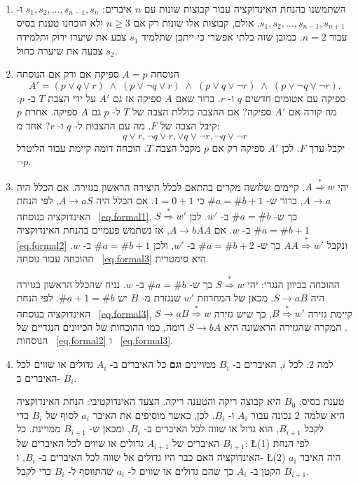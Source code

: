\begin{enumerate}
\item
השתמשנו בהנחת האינדוקציה עבור קבוצות שונות עם
$n$
איברים:
$s_1,s_2,\ldots,s_{n-1},s_n$
ו-%
$s_1,s_2,\ldots,s_{n-1},s_{n+1}$.
אולם, קבוצות אלו שונות רק אם
$n\geq 3$
ולא הוכחנו טענת בסיס עבור 
$n=2$.
כמובן שזה בלתי אפשרי כי ייתכן שתלמיד
$s_1$
צבע את שיערו ירוק ותלמידה
$s_2$
צבעה את שיערה כחול.


\item
הנוסחה
$A=p$
ספיקה אם ורק אם הנוסחה
\[
A'= (p \vee q \vee r) \;\wedge\; (p \vee \neg q \vee r) \;\wedge\; (p \vee q \vee \neg r) \;\wedge\; (p \vee \neg q \vee \neg r).
\]
ספיקה עם אטומים חדשים 
$q$
ו-%
$r$.
ברור שאם
$A$
ספיקה אז גם 
$A'$
על ידי הצבת
$T$
ב-%
$p$.
מה קורה אם 
$A'$
ספיקה? אם ההצבה כוללת הצבה של 
$T$
ל-%
$p$
גם
$A$
ספיקה. אחרת
$p$
קיבל הצבה של
$F$.
מה עם ההצבות ל-%
$q$
ו-%
$r$?
אחד מ:
\[
q \vee r, \neg q \vee r,\vee q \vee \neg r, \neg q \vee \neg r
\]
יקבל ערך
$F$.
לכן
$A'$
ספיקה רק אם 
$p$
מקבל הצבה
$T$.
הוכחה דומה קיימת עבור הליטרל
$\neg p$.

\item
יהי
$A\stackrel{*}{\Rightarrow} w$.
קיימים שלושה מקרים בהתאם לכלל היצירה הראשון בגזירה. אם הכלל היה
$A \rightarrow a$,
ברור ש-%
$\#a=\#b+1$
כי
$1=0+1$.
אם הכלל היה
$A\rightarrow aS$,
לפי הנחת האינדוקציה בנוסחה~%
\ref{eq.formal1}, $S\stackrel{*}{\Rightarrow} w'$
כך ש-%
$\#a=\#b$
ב-%
$w'$.
לכן
$\#a=\#b+1$
ב-%
$w$.
אם
$A\rightarrow bAA$,
אז נשתמש פעמיים בהנחת האינדוקציה
\ref{eq.formal2}
ונקבל
$AA\stackrel{*}{\Rightarrow} w'$
כך ש-%
$\#a=\#b+2$
ב-%
$w'$,
ולכן
$\#a=\#b+1$
ב-%
$w$.
ההוכחה עבור נוסחה~%
\ref{eq.formal3}
היא סימטרית.

ההוכחה בכיוון הנגדי: יהי
$S\stackrel{*}{\Rightarrow} w$
כך ש-%
$\#a=\#b$
ב-%
$w$.
נניח שהכלל הראשון בגזירה היה
$S\rightarrow aB$.
מכאן של המחרוזת
$w'$
שנגזרת מ-%
$B$
יש
$\#a+1=\#b$. 
לפי הנחת האינדוקציה בנוסחה~%
\ref{eq.formal3},
קיימת גזירה
$B\stackrel{*}{\Rightarrow} w'$,
כך שיש גזירה
$S \rightarrow aB \stackrel{*}{\Rightarrow} w$.
המקרה שהגזירה הראשונה היא
$S\rightarrow bA$
דומה, כמו ההוכחות של הכיוונים הנגדיים של הנוסחות~%
\ref{eq.formal2}
ו~%
\ref{eq.formal3}.


\item
למה 2: לכל 
$i$,
האיברים ב-%
$B_i$
ממויינים
\textbf{וגם}
כל האיברים ב-%
$A_i$
גדולים או שווים לכל האיברים ב-%
$B_i$.

טענת בסיס: 
$B_0$
היא קבוצה ריקה והטענה ריקה. הצעד האינדוקטיבי: הנחת האינדוקציה היא שלמה~2 נכונה עבור 
$A_i$
ו-%
$B_i$.
לכן, כאשר מוסיפים את האיבר
$a_i$
לסוף של
$B_i$
כדי לקבל
$B_{i+1}$,
הוא גדול או שווה לכל האיברים ב-%
$B_i$, 
ומכאן ש-%
$B_{i+1}$
ממויינת. כל האיברים של
$A_{i+1}$
גדולים או שווים לכל האיברים של
$B_{i+1}$: \L{(1)}
לפי הנחת האינדוקציה האם כבר היו גדולים אל שווה לכל האיברים ב-%
$B_i$,
ו-%
\L{(2)}
$a_i$
היה האיבר הקטן ב-%
$A_i$
כך שהם גדולים או שווים ל-%
$a_i$
שהתווסף ל-%
$B_i$
כדי לקבל
$B_{i+1}$.


\end{enumerate}

